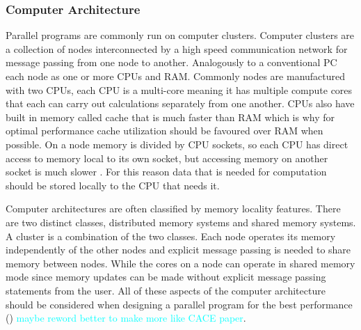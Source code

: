 \documentclass[preprint,11pt,authoryear]{elsarticle}
\begin{document}
		\subsubsection{Computer Architecture}
	    \par Parallel programs are commonly run on computer clusters. Computer clusters are a collection of nodes interconnected by a high speed communication network for message passing from one node to another. Analogously to a conventional PC each node as one or more CPUs and RAM. Commonly nodes are manufactured with two CPUs, each CPU is a multi-core meaning it has multiple compute cores that each can carry out calculations separately from one another. CPUs also have built in memory called cache that is much faster than RAM which is why for optimal performance cache utilization should be favoured over RAM when possible. On a node memory is divided by CPU sockets, so each CPU has direct access to memory local to its own socket, but accessing memory on another socket is much slower \cite{Jin2011}. For this reason data that is needed for computation should be stored locally to the CPU that needs it.  
	    \par Computer architectures are often classified by memory locality features. There are two distinct classes, distributed memory systems and shared memory systems. A cluster is a combination of the two classes. Each node operates its memory independently of the other nodes and explicit message passing is needed to share memory between nodes. While the cores on a node can operate in shared memory mode since memory updates can be made without explicit message passing statements from the user. All of these aspects of the computer architecture should be considered when designing a parallel program for the best performance (\cite{Adhianto2007}) \textcolor{cyan}{maybe reword better to make more like CACE paper}.
		
\end{document}
